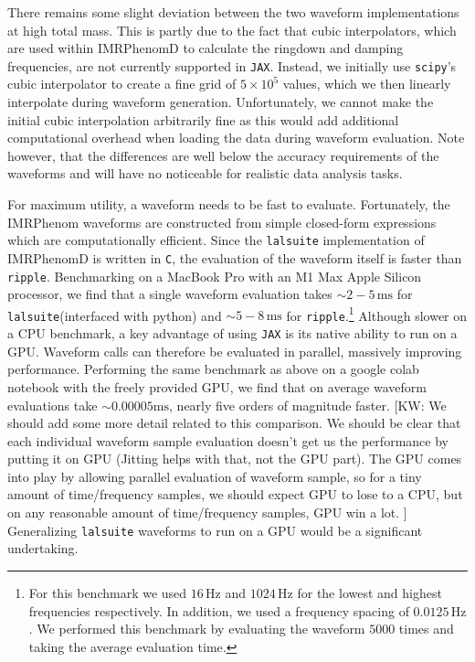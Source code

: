 \documentclass[twocolumn]{aastex631}
\newcommand{\jax}{\texttt{JAX}\xspace}
\newcommand{\ripple}{\texttt{ripple}\xspace}
\newcommand{\lalsuite}{\texttt{lalsuite}\xspace}
\newcommand{\kw}[1]{{\color{rb4}[KW: #1 ]}}
\begin{document}
There remains some slight deviation between the two waveform implementations at high total mass. 
This is partly due to the fact that cubic interpolators, which are used within IMRPhenomD to calculate the ringdown and damping frequencies, are not currently supported in \jax.
Instead, we initially use \texttt{scipy}'s cubic interpolator to create a fine grid of $5\times10^5$ values, which we then linearly interpolate during waveform generation.
Unfortunately, we cannot make the initial cubic interpolation arbitrarily fine as this would add additional computational overhead when loading the data during waveform evaluation.
Note however, that the differences are well below the accuracy requirements of the waveforms and will have no noticeable for realistic data analysis tasks.

For maximum utility, a waveform needs to be fast to evaluate.
Fortunately, the IMRPhenom waveforms are constructed from simple closed-form expressions which are computationally efficient.
Since the \lalsuite implementation of IMRPhenomD is written in \texttt{C}, the evaluation of the waveform itself is faster than \ripple.
Benchmarking on a MacBook Pro with an M1 Max Apple Silicon processor, we find that a single waveform evaluation takes $\sim 2-5\,\mathrm{ms}$ for \lalsuite (interfaced with python) and $\sim 5-8\,\mathrm{ms}$ for \ripple.\footnote{
    For this benchmark we used $16\,\mathrm{Hz}$ and $1024\,\mathrm{Hz}$ for the lowest and highest frequencies respectively. 
    In addition, we used a frequency spacing of $0.0125\,\mathrm{Hz}$. 
    We performed this benchmark by evaluating the waveform $5000$ times and taking the average evaluation time.
}
Although slower on a CPU benchmark, a key advantage of using \jax is its native ability to run on a GPU.
Waveform calls can therefore be evaluated in parallel, massively improving performance.
Performing the same benchmark as above on a google colab notebook with the freely provided GPU, we find that on average waveform evaluations take $\sim 0.00005\mathrm{ms}$, nearly five orders of magnitude faster.
\kw{We should add some more detail related to this comparison. We should be clear that each individual waveform sample evaluation doesn't get us the performance by putting it on GPU (Jitting helps with that, not the GPU part). The GPU comes into play by allowing parallel evaluation of waveform sample, so for a tiny amount of time/frequency samples, we should expect GPU to lose to a CPU, but on any reasonable amount of time/frequency samples, GPU win a lot.}
Generalizing \lalsuite waveforms to run on a GPU would be a significant undertaking.
\end{document}
